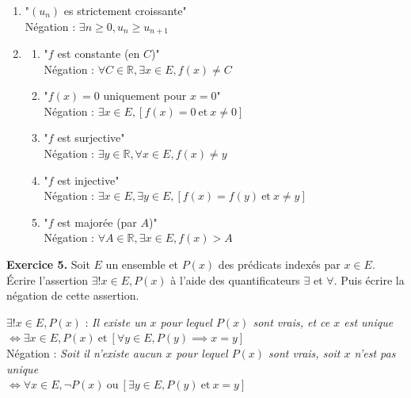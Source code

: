 \documentclass[a4paper, 10pt]{report}
\begin{document}
	\colorbox{solution}
	{
		\begin{minipage}{0.9\textwidth}
			\begin{enumerate}[label=\arabic*.]
				\item "$(u_n)$ es strictement croissante"\\
				Négation : $\exists n \geq 0, u_n \geq u_{n+1}$
				\item
				\begin{enumerate}[label=(\alph*)]
					\item "$f$ est constante (en $C$)"\\
					Négation : $\forall C \in \mathbb{R}, \exists x \in E,
						f(x) \neq C$
					\item "$f(x) = 0$ uniquement pour $x = 0$"\\
					Négation : $\exists x \in E,
						[f(x) = 0\ \text{et}\ x \neq 0]$
					\item "$f$ est surjective"\\
					Négation : $\exists y \in \mathbb{R}, \forall x \in E,
						f(x) \neq y$
					\item "$f$ est injective"\\
					Négation : $\exists x \in E, \exists y \in E,
						[f(x) = f(y)\ \text{et}\ x \neq y]$
					\item "$f$ est majorée (par $A$)"\\
					Négation : $\forall A \in \mathbb{R}, \exists x \in E,
						f(x) > A$
				\end{enumerate}
			\end{enumerate}
		\end{minipage}
	}
	
	\vspace{5mm}
	\noindent
	{\color{red}\textbf{Exercice 5.}}
	Soit $E$ un ensemble et $P(x)$ des prédicats indexés par $x \in E$.
	Écrire l'assertion $\exists! x \in E, P(x)$ à l'aide des
	quantificateurs $\exists$ et $\forall$. Puis écrire la négation de
	cette assertion.
	
	\colorbox{solution}
	{
		\begin{minipage}{0.9\textwidth}
			$\exists! x \in E, P(x)$ : \textit{Il existe un $x$ pour lequel
			$P(x)$ sont vrais, et ce $x$ est unique}\\ 
			$\iff \exists x \in E, P(x)\ \text{et}\
				[\forall y \in E, P(y) \implies x = y]$\\
				
			Négation : \textit{Soit il n'existe aucun $x$ pour lequel
			$P(x)$ sont vrais, soit $x$ n'est pas unique}\\
			$\iff \forall x \in E, \lnot P(x)\ \text{ou}\
				[\exists y \in E, P(y)\ \text{et}\ x = y]$
		\end{minipage}
	}
	
\end{document}
